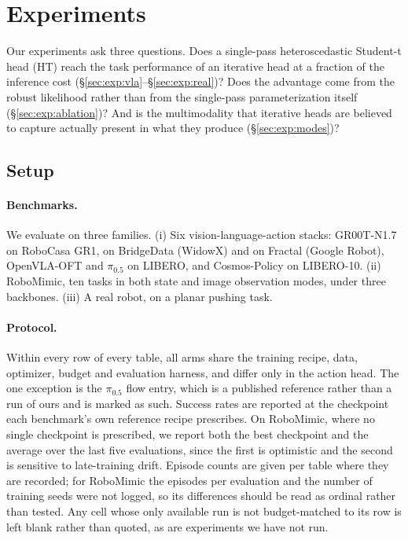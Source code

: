 \section{Experiments}
\label{sec:exp}

Our experiments ask three questions. Does a single-pass heteroscedastic
Student-t head (HT) reach the task performance of an iterative head at a
fraction of the inference cost (\S\ref{sec:exp:vla}--\S\ref{sec:exp:real})?
Does the advantage come from the robust likelihood rather than from the
single-pass parameterization itself (\S\ref{sec:exp:ablation})? And is the
multimodality that iterative heads are believed to capture actually present in
what they produce (\S\ref{sec:exp:modes})?

\subsection{Setup}
\label{sec:exp:setup}

\paragraph{Benchmarks.} We evaluate on three families. (i) Six
vision-language-action stacks: GR00T-N1.7 on RoboCasa GR1, on BridgeData
(WidowX) and on Fractal (Google Robot), OpenVLA-OFT and $\pi_{0.5}$ on LIBERO,
and Cosmos-Policy on LIBERO-10. (ii) RoboMimic, ten tasks in both state and
image observation modes, under three backbones. (iii) A real robot, on a
planar pushing task.

\paragraph{Protocol.} Within every row of every table, all arms share the
training recipe, data, optimizer, budget and evaluation harness, and differ
only in the action head. The one exception is the $\pi_{0.5}$ flow entry, which
is a published reference rather than a run of ours and is marked as such. Success rates are reported at the checkpoint each
benchmark's own reference recipe prescribes. On RoboMimic, where no single
checkpoint is prescribed, we report both the best checkpoint and the average
over the last five evaluations, since the first is optimistic and the second is
sensitive to late-training drift. Episode counts are given per table where they are
recorded; for RoboMimic the episodes per evaluation and the number of training
seeds were not logged, so its differences should be read as ordinal rather than
tested. Any cell whose only available run is not budget-matched to its row is
left blank rather than quoted, as are experiments we have not run.

